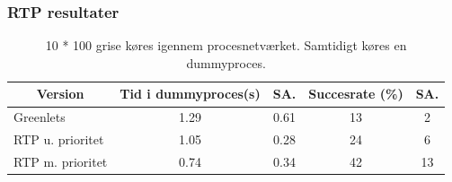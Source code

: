 \documentclass[12pt]{beamer}
\newcommand\mc[1]{\multicolumn{1}{c}{\textbf {#1}}} %
\begin{document}


\begin{frame}
  	\frametitle{RTP resultater}
	\tiny 
	\begin{table}[htbp]
		\centering
		\begin{tabular}{lcccc}
		   	\toprule
		    \mc{Version}&\mc{Tid i dummyproces(s)}&\mc{SA.}& \mc{Succesrate (\%)}&\mc{SA.}\\
		    \midrule
		    Greenlets         & 1.29 & 0.61 & 13 & 2  \\
		    RTP u. prioritet  & 1.05 & 0.28 & 24 & 6  \\
		    RTP m. prioritet  & 0.74 & 0.34 & 42 & 13 \\
		    \bottomrule
		\end{tabular}
		\caption[]{\tiny 10 * 100 grise køres igennem procesnetværket. Samtidigt køres en dummyproces.}
	\end{table}
\end{frame}
\end{document}
